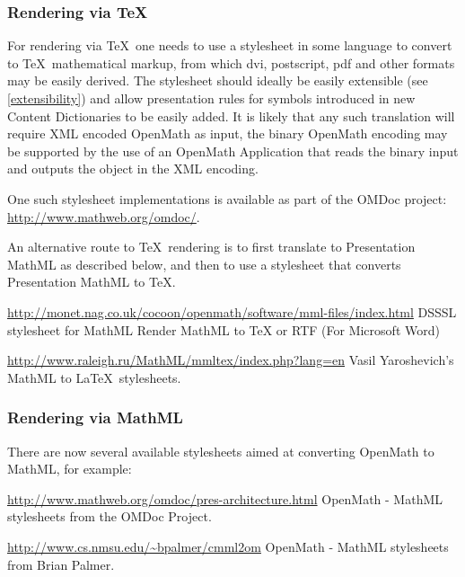 \documentclass[report,keylogo]{openmath}
\begin{document}
\subsubsection{Rendering via \TeX}


For rendering via \TeX\ one needs to use a stylesheet in some language
to convert to \TeX\ mathematical markup, from which dvi, postscript,
pdf and other formats may be easily derived. The stylesheet should
ideally be easily extensible (see \ref{extensibility}) and allow
presentation rules for symbols introduced in new Content Dictionaries
to be easily added. It is likely that any such translation  will require
XML encoded OpenMath as input, the binary OpenMath encoding may be
supported by the use of an OpenMath Application that reads the binary
input and outputs the object in the XML encoding.

One such stylesheet implementations is available as part of the OMDoc
project: \url{http://www.mathweb.org/omdoc/}. 


An alternative route to \TeX\ rendering is to first translate to
Presentation MathML as described below, and then to use a stylesheet
that converts Presentation MathML to \TeX.

\url{http://monet.nag.co.uk/cocoon/openmath/software/mml-files/index.html}
DSSSL stylesheet for MathML Render MathML to TeX or RTF (For Microsoft
Word)

\url{http://www.raleigh.ru/MathML/mmltex/index.php?lang=en} Vasil
Yaroshevich's MathML to \LaTeX\ stylesheets.


\subsubsection{Rendering via MathML}

There are now several available stylesheets aimed at converting
OpenMath to MathML, for example:


\url{http://www.mathweb.org/omdoc/pres-architecture.html} OpenMath -
MathML stylesheets from the OMDoc Project.

\url{http://www.cs.nmsu.edu/~bpalmer/cmml2om} OpenMath - MathML
stylesheets from Brian Palmer.
\end{document}
